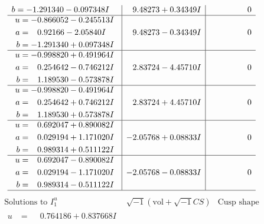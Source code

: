 \documentclass[1p]{elsarticle_modified}
\theoremstyle{definition}
\newcommand{\I}{\sqrt{-1}}
\begin{document}
$$\begin{array}{c|c|c}
\begin{aligned}
b &= -1.291340 - 0.097348 I\end{aligned}
 & \phantom{-}9.48273 + 0.34349 I & \phantom{-0.000000 } 0 \\ \hline\begin{aligned}
u &= -0.866052 - 0.245513 I \\
a &= \phantom{-}0.92166 - 2.05840 I \\
b &= -1.291340 + 0.097348 I\end{aligned}
 & \phantom{-}9.48273 - 0.34349 I & \phantom{-0.000000 } 0 \\ \hline\begin{aligned}
u &= -0.998820 + 0.491964 I \\
a &= \phantom{-}0.254642 - 0.746212 I \\
b &= \phantom{-}1.189530 - 0.573878 I\end{aligned}
 & \phantom{-}2.83724 - 4.45710 I & \phantom{-0.000000 } 0 \\ \hline\begin{aligned}
u &= -0.998820 - 0.491964 I \\
a &= \phantom{-}0.254642 + 0.746212 I \\
b &= \phantom{-}1.189530 + 0.573878 I\end{aligned}
 & \phantom{-}2.83724 + 4.45710 I & \phantom{-0.000000 } 0 \\ \hline\begin{aligned}
u &= \phantom{-}0.692047 + 0.890082 I \\
a &= \phantom{-}0.029194 + 1.171020 I \\
b &= \phantom{-}0.989314 + 0.511122 I\end{aligned}
 & -2.05768 + 0.08833 I & \phantom{-0.000000 } 0 \\ \hline\begin{aligned}
u &= \phantom{-}0.692047 - 0.890082 I \\
a &= \phantom{-}0.029194 - 1.171020 I \\
b &= \phantom{-}0.989314 - 0.511122 I\end{aligned}
 & -2.05768 - 0.08833 I & \phantom{-0.000000 } 0\\
 \hline 
 \end{array}$$\newpage$$\begin{array}{c|c|c}  
\text{Solutions to }I^u_{1}& \I (\text{vol} + \sqrt{-1}CS) & \text{Cusp shape}\\
 \hline 
\begin{aligned}
u &= \phantom{-}0.764186 + 0.837668 I \\

\end{aligned}
\end{array}$$
\end{document}

